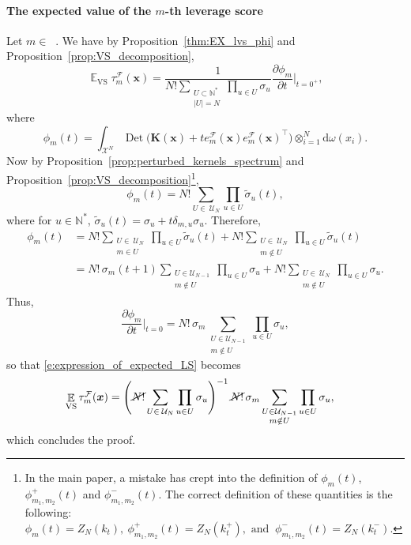 \documentclass[twoside,11pt]{book}
\DeclareMathOperator{\Det}{Det}
\DeclareMathOperator{\VS}{\mathrm{VS}}
\DeclareMathOperator{\Tran}{\intercal}
\DeclareMathOperator{\EX}{\mathbb{E}}
\DeclareMathOperator{\F}{\mathcal{F}}
\DeclareMathOperator{\Ns}{\mathbb{N}^{*}}
\def\UN{\:\mathcal{U}_N}
\begin{document}
\paragraph{The expected value of the $m$-th leverage score}
Let $m \in \Ns$. We have by Proposition~\ref{thm:EX_lvs_phi} and Proposition~\ref{prop:VS_decomposition},
\begin{equation}
\EX_{\VS} \tau_{m}^{\F}(\bm{x})  = \frac{1}{N!\sum\limits_{\substack{U \subset \mathbb{N}^{*}\\ |U| = N}} \prod\limits_{u \in U}\sigma_{u}}  \frac{\partial \phi_{m}}{ \partial t }|_{t = 0^{+}},
\label{e:expression_of_expected_LS}\end{equation}
where
\begin{equation}
\phi_{m}(t) = \int_{\mathcal{X}^{N}} \Det \bigg(\bm{K}(\bm{x})+t e_{m}^{\mathcal{F}}(\bm{x})e_{m}^{\mathcal{F}}(\bm{x})^{\Tran} \bigg) \otimes_{i =1}^{N} \mathrm{d}\omega(x_{i}).
\end{equation}
Now by Proposition~\ref{prop:perturbed_kernels_spectrum} and Proposition~\ref{prop:VS_decomposition}\footnote{In the main paper, a mistake has crept into the definition of $\phi_{m}(t)$, $\phi_{m_{1},m_{2}}^{+}(t)$ and $\phi_{m_{1},m_{2}}^{-}(t)$. The correct definition of these quantities is the following: $
\phi_{m}(t) = Z_{N}(k_{t}) , \: \phi_{m_{1},m_{2}}^{+}(t) = Z_{N}(k_{t}^{+}),  \text{ and }\: \phi_{m_{1},m_{2}}^{-}(t) = Z_{N}(k_{t}^{-}). $},
\begin{equation}
\phi_{m}(t) = N! \sum\limits_{U\in\UN} \prod\limits_{u \in U} \tilde{\sigma}_{u}(t),
\end{equation}
where for $u \in \mathbb{N}^{*}$, $\tilde{\sigma}_{u}(t) = \sigma_{u} + t\delta_{m,u}\sigma_{u}$.
Therefore,
\begin{align}
\phi_{m}(t) & = N!\sum\limits_{\substack{U \in\UN \\ m \in U}} \prod\limits_{u \in U} \tilde{\sigma}_{u}(t) + N!\sum\limits_{\substack{U \in\UN \\ m \notin U}} \prod\limits_{u \in U} \tilde{\sigma}_{u}(t) \\
& = N!\,\sigma_{m}(t+1)\sum\limits_{\substack{U\in \mathcal{U}_{N-1}\\ m \notin U}} \prod\limits_{u \in U} \sigma_{u} + N!\sum\limits_{\substack{U \in\UN \\ m \notin U}} \prod\limits_{u \in U} \sigma_{u}.
\end{align}
Thus,  
\begin{equation}
\frac{\partial \phi_{m}}{\partial t}|_{t = 0} = N!\,\sigma_{m}\sum\limits_{\substack{U\in \mathcal{U}_{N-1}\\ m \notin U}} \prod\limits_{u \in U} \sigma_{u},
\end{equation}
so that \eqref{e:expression_of_expected_LS} becomes
\begin{align}
\EX_{\VS} \tau_{m}^{\F}(\bm{x}) & = \left(\cancel{N!}\sum\limits_{U\in\UN}\prod\limits_{u \in U}\sigma_{u} \right)^{-1} \cancel{N!}\,\sigma_{m}\sum\limits_{\substack{U\in \mathcal{U}_{N-1}\\ m \notin U}} \prod\limits_{u \in U} \sigma_{u},
\end{align}
which concludes the proof.
\end{document}
